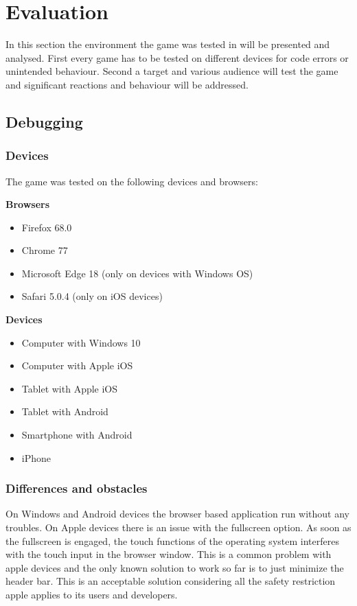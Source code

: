 
\chapter{Evaluation}\label{ch:evaluation}
In this section the environment the game was tested in will be presented and analysed.
First every game has to be tested on different devices for code errors or unintended behaviour.
Second a target and various audience will test the game and significant reactions and behaviour will be addressed.

\section{Debugging}\label{sec:debugging}
\subsection{Devices}\label{subsec:devices}
The game was tested on the following devices and browsers:

\textbf{Browsers}
\begin{itemize}
    \item Firefox 68.0
    \item Chrome 77
    \item Microsoft Edge 18 (only on devices with Windows OS)
    \item Safari 5.0.4 (only on iOS devices)
\end{itemize}

\textbf{Devices}
\begin{itemize}
    \item Computer with Windows 10
    \item Computer with Apple iOS
    \item Tablet with Apple iOS
    \item Tablet with Android
    \item Smartphone with Android
    \item iPhone
\end{itemize}

\subsection{Differences and obstacles}\label{subsec:differences-and-obstacles}
On Windows and Android devices the browser based application run without any troubles.
On Apple devices there is an issue with the fullscreen option.
As soon as the fullscreen is engaged, the touch functions of the operating system interferes with the touch input in the
browser window. This is a common problem with apple devices and the only known solution to work so far is to just
minimize the header bar.
This is an acceptable solution considering all the safety restriction apple applies to its users and developers.

